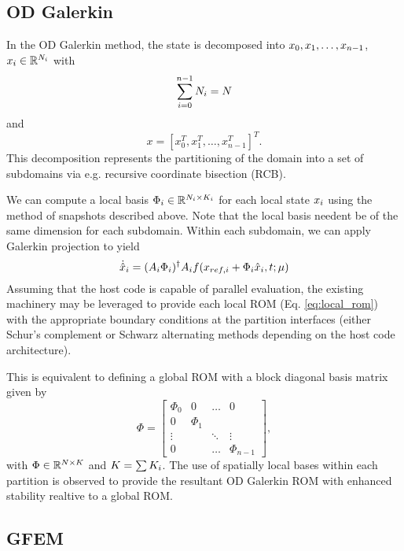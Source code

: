 \subsection{OD Galerkin} \label{sec:od_galerkin}

In the OD Galerkin method, the state is decomposed into $x_0, x_1, \dots, x_{n-1}$, $x_i\in\mathbb{R}^{N_i}$ with
\begin{equation}
\sum_{i=0}^{n-1} N_i = N
\end{equation}
and 
\begin{equation}
x=[x_0^T, x_1^T, \dots, x_{n-1}^T]^T.
\end{equation}
This decomposition represents the partitioning of the domain into a set of subdomains via e.g. recursive coordinate bisection (RCB).

We can compute a local basis $\Phi_i\in\mathbb{R}^{N_i\times K_i}$ for each local state $x_i$ using the method of snapshots described above.
Note that the local basis needent be of the same dimension for each subdomain.
Within each subdomain, we can apply Galerkin projection to yield
\begin{equation}
\label{eq:local_rom}
\dot{\hat{x}}_i = (A_i\Phi_i)^\dagger A_if(x_{ref,i} + \Phi_i\hat{x}_i,t;\mu)
\end{equation}
Assuming that the host code is capable of parallel evaluation, the existing machinery may be leveraged to provide each local ROM (Eq. \ref{eq:local_rom}) with the appropriate boundary conditions at the partition interfaces (either Schur's complement or Schwarz alternating methods depending on the host code architecture).

This is equivalent to defining a global ROM with a block diagonal basis matrix given by
\begin{equation}
\label{eq:block_basis}
\Phi = 
\begin{bmatrix}
\Phi_0 & 0 & \dots & 0 \\
0      & \Phi_1 &  &  \\
\vdots & & \ddots & \vdots \\
0 & & \dots & \Phi_{n-1}
\end{bmatrix},
\end{equation}
with $\Phi\in\mathbb{R}^{N\times K}$ and $K=\sum K_i$.
The use of spatially local bases within each partition is observed to provide the resultant OD Galerkin ROM with enhanced stability realtive to a global ROM.

\subsection{GFEM}

